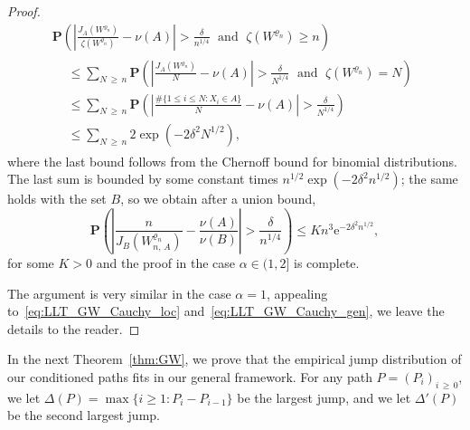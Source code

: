 \documentclass[AHL,Unicode,longabstracts,published]{cedram}
\newcommand{\ensembles}[1]{\mathbf{#1}}
\renewcommand{\P}{\ensembles{P}}
\renewcommand{\Pr}[1]{\P\left(#1\right)}
\newcommand{\1}{\ensembles{1}}
\renewcommand{\le}{\leqslant}
\renewcommand{\ge}{\geqslant}
\newcommand{\e}{\mathrm{e}}
\begin{document}
\begin{proof}
\begin{multline*}
\Pr{\left|\frac{J_A\left(W^{\varrho_n}\right)}{\zeta\left(W^{\varrho_n}\right)}- \nu(A)\right| > \frac{\delta}{n^{1/4}}\;\text{ and }\; \zeta\left(W^{\varrho_n}\right) \ge n}
\\
\begin{aligned}
&\le \sum_{N\,\ge\,n} \Pr{\left|\frac{J_A\left(W^{\varrho_n}\right)}{N}- \nu(A)\right| > \frac{\delta}{N^{1/4}}\;\text{ and }\; \zeta\left(W^{\varrho_n}\right) = N}
\\
&\le \sum_{N\,\ge\,n} \Pr{\left|\frac{\#\{1 \le i \le N : X_i \in A\}}{N}- \nu(A)\right| > \frac{\delta}{N^{1/4}}}
\\
&\le \sum_{N\,\ge\,n} 2 \exp\left(- 2 \delta^2 N^{1/2}\right),
\end{aligned}
\end{multline*}
where the last bound follows from the Chernoff bound for binomial distributions. The last sum is bounded by some constant times $n^{1/2} \exp(- 2 \delta^2 n^{1/2})$; the same holds with the set $B$, so we obtain after a union bound,
\[
\Pr{\left|\frac{n}{J_B(W^{\varrho_n}_{n,\,A})}- \frac{\nu(A)}{\nu(B)}\right| > \frac{\delta}{n^{1/4}}}
\le K n^3 \e^{- 2 \delta^2 n^{1/2}},
\]
for some $K > 0$ and the proof in the case $\alpha \in (1,2]$ is complete.

The argument is very similar in the case $\alpha=1$, appealing to~\eqref{eq:LLT_GW_Cauchy_loc} and~\eqref{eq:LLT_GW_Cauchy_gen}, we leave the details to the reader.
\end{proof}



In the next Theorem~\ref{thm:GW}, we prove that the empirical jump distribution of our conditioned paths fits in our general framework. For any path $P = (P_i)_{i\,\ge\,0}$, we let $\Delta(P) = \max\{i \ge 1 : P_i - P_{i-1}\}$ be the largest jump, and we let $\Delta'(P)$ be the second largest jump.
\end{document}
